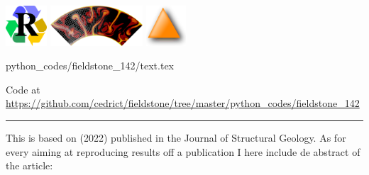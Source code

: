 \includegraphics[height=1.5cm]{images/pictograms/replication}
\includegraphics[height=1.5cm]{images/pictograms/aspect_logo}
\includegraphics[height=1.5cm]{images/pictograms/triangle}

\begin{flushright} {\tiny {\color{gray} python\_codes/fieldstone\_142/text.tex}} \end{flushright}



\begin{center}
Code at \url{https://github.com/cedrict/fieldstone/tree/master/python_codes/fieldstone_142}
\end{center}

\par\noindent\rule{\textwidth}{0.4pt}

This \stone is based on \textcite{hams22} (2022) published in the Journal of Structural Geology.
As for every \stone aiming at reproducing results off a publication I here include de abstract
of the article:

